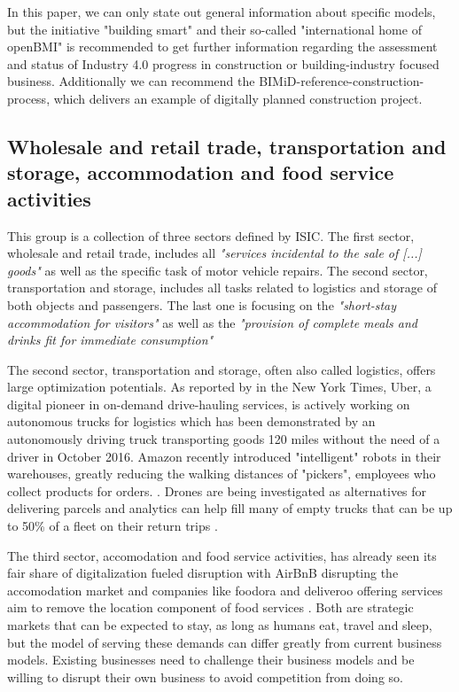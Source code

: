 In this paper, we can only state out general information about specific models, but the initiative "building smart" %
and their so-called "international home of openBMI" is recommended to get further information regarding the assessment and status of Industry 4.0 progress in construction or building-industry focused business. Additionally we can recommend the BIMiD-reference-construction-process, which delivers an example of digitally planned construction project. %




\subsection{Wholesale and retail trade, transportation and storage, accommodation and food service activities}

This group is a collection of three sectors defined by \ac{ISIC}. The first sector, wholesale and retail trade, includes all \emph{"services incidental to the sale of [...] goods"}\cite[p.179]{ISIC:2008} as well as the specific task of motor vehicle repairs. The second sector, transportation and storage, includes all tasks related to logistics and storage of both objects and passengers.\cite[p.194]{ISIC:2008} The last one is focusing on the \emph{"short-stay accommodation for visitors"} as well as the \emph{"provision of complete meals and drinks fit for immediate consumption"}\cite[p.202]{ISIC:2008}

The second sector, transportation and storage, often also called logistics, offers large optimization potentials. As reported by \citeauthor{nytimesdrivingtruck:2016} in the New York Times, Uber, a digital pioneer in on-demand drive-hauling services, is actively working on autonomous trucks for logistics which has been demonstrated by an autonomously driving truck transporting goods 120 miles without the need of a driver in October 2016. Amazon recently introduced "intelligent" robots in their warehouses, greatly reducing the walking distances of "pickers", employees who collect products for orders. \cite{Kiva:amazon:Ma:2016:OTA:2936924.2937092}. Drones are being investigated as alternatives for delivering parcels and analytics can help fill many of empty trucks that can be up to 50\% of a fleet on their return trips \cite{worldforumlogistics:2016}.

The third sector, accomodation and food service activities, has already seen its fair share of digitalization fueled disruption with AirBnB disrupting the accomodation market and companies like foodora and deliveroo offering services aim to remove the location component of food services \cite{bloombergfoodora:2016}. Both are strategic markets that can be expected to stay, as long as humans eat, travel and sleep, but the model of serving these demands can differ greatly from current business models. Existing businesses need to challenge their business models and be willing to disrupt their own business to avoid competition from doing so.

